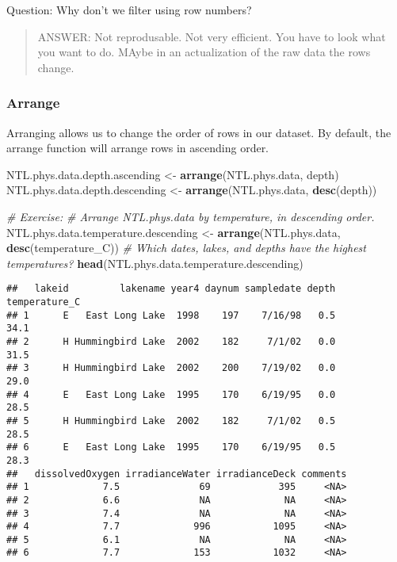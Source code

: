 \documentclass[]{article}
\newenvironment{Shaded}{\begin{snugshade}}{\end{snugshade}}
\newcommand{\KeywordTok}[1]{\textcolor[rgb]{0.13,0.29,0.53}{\textbf{#1}}}
\newcommand{\StringTok}[1]{\textcolor[rgb]{0.31,0.60,0.02}{#1}}
\newcommand{\CommentTok}[1]{\textcolor[rgb]{0.56,0.35,0.01}{\textit{#1}}}
\newcommand{\NormalTok}[1]{#1}
\begin{document}
Question: Why don't we filter using row numbers?

\begin{quote}
ANSWER: Not reprodusable. Not very efficient. You have to look what you
want to do. MAybe in an actualization of the raw data the rows change.
\end{quote}

\subsubsection{Arrange}\label{arrange}

Arranging allows us to change the order of rows in our dataset. By
default, the arrange function will arrange rows in ascending order.

\begin{Shaded}
\begin{Highlighting}[]
\NormalTok{NTL.phys.data.depth.ascending <-}\StringTok{ }\KeywordTok{arrange}\NormalTok{(NTL.phys.data, depth)}
\NormalTok{NTL.phys.data.depth.descending <-}\StringTok{ }\KeywordTok{arrange}\NormalTok{(NTL.phys.data, }\KeywordTok{desc}\NormalTok{(depth))}

\CommentTok{# Exercise: }
\CommentTok{# Arrange NTL.phys.data by temperature, in descending order. }
\NormalTok{NTL.phys.data.temperature.descending <-}\StringTok{ }\KeywordTok{arrange}\NormalTok{(NTL.phys.data, }\KeywordTok{desc}\NormalTok{(temperature_C))}
\CommentTok{# Which dates, lakes, and depths have the highest temperatures?}
\KeywordTok{head}\NormalTok{(NTL.phys.data.temperature.descending)}
\end{Highlighting}
\end{Shaded}

\begin{verbatim}
##   lakeid         lakename year4 daynum sampledate depth temperature_C
## 1      E   East Long Lake  1998    197    7/16/98   0.5          34.1
## 2      H Hummingbird Lake  2002    182     7/1/02   0.0          31.5
## 3      H Hummingbird Lake  2002    200    7/19/02   0.0          29.0
## 4      E   East Long Lake  1995    170    6/19/95   0.0          28.5
## 5      H Hummingbird Lake  2002    182     7/1/02   0.5          28.5
## 6      E   East Long Lake  1995    170    6/19/95   0.5          28.3
##   dissolvedOxygen irradianceWater irradianceDeck comments
## 1             7.5              69            395     <NA>
## 2             6.6              NA             NA     <NA>
## 3             7.4              NA             NA     <NA>
## 4             7.7             996           1095     <NA>
## 5             6.1              NA             NA     <NA>
## 6             7.7             153           1032     <NA>
\end{verbatim}
\end{document}
